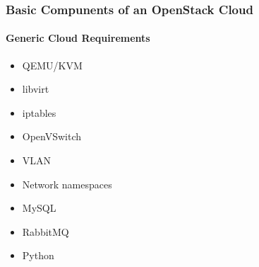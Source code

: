 \documentclass[helvetica,english,utf8,notitle,nologo]{beamer}
\begin{document}
\begin{frame}
  \frametitle{Basic Compunents of an OpenStack Cloud}
  \framesubtitle{Generic Cloud Requirements}
  \begin{itemize}
  \item QEMU/KVM
  \item libvirt
  \item iptables
  \item OpenVSwitch
  \item VLAN
  \item Network namespaces
  \item MySQL
  \item RabbitMQ
  \item Python
  \end{itemize}
\end{frame}
\end{document}
